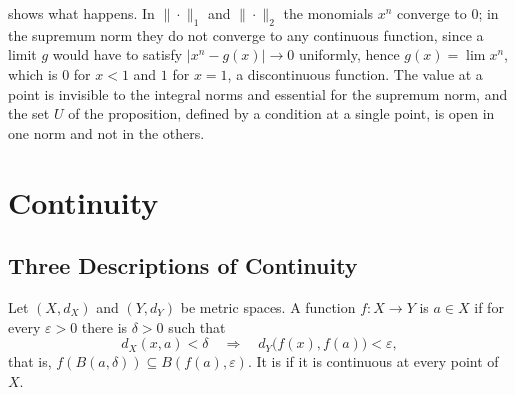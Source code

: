 \begin{figure}
\end{figure}

 shows what happens. In $\|\cdot\|_1$ and $\|\cdot\|_2$ the monomials $x^n$ converge to $0$; in the supremum norm they do not converge to any continuous function, since a limit $g$ would have to satisfy $|x^n-g(x)|\to0$ uniformly, hence $g(x)=\lim x^n$, which is $0$ for $x<1$ and $1$ for $x=1$, a discontinuous function. The value at a point is invisible to the integral norms and essential for the supremum norm, and the set $U$ of the proposition, defined by a condition at a single point, is open in one norm and not in the others.

\section{Continuity}
\label{sec:continuity-metric}

\subsection{Three Descriptions of Continuity}

\begin{definition}[Continuity]
\label{def:metric-continuity}
Let $(X,d_X)$ and $(Y,d_Y)$ be metric spaces. A function $f\colon X\to Y$ is  $a\in X$ if for every $\varepsilon>0$ there is $\delta>0$ such that
\[
d_X(x,a)<\delta\quad\Longrightarrow\quad d_Y\bigl(f(x),f(a)\bigr)<\varepsilon ,
\]
that is, $f(B(a,\delta))\subseteq B(f(a),\varepsilon)$. It is  if it is continuous at every point of $X$.
\end{definition}

